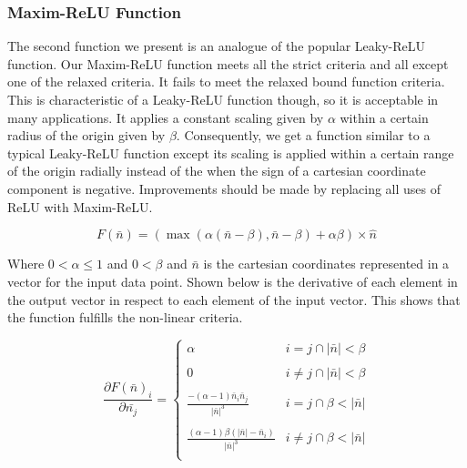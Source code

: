 \documentclass[onecolumn]{article}
\begin{document}
    \subsubsection{Maxim-ReLU Function}
    The second function we present is an analogue of the popular Leaky-ReLU function. Our Maxim-ReLU function meets all the strict criteria and all except one of the relaxed criteria. It fails to meet the relaxed bound function criteria. This is characteristic of a Leaky-ReLU function though, so it is acceptable in many applications. It applies a constant scaling given by $\alpha$ within a certain radius of the origin given by $\beta$. Consequently, we get a function similar to a typical Leaky-ReLU function except its scaling is applied within a certain range of the origin radially instead of the when the sign of a cartesian coordinate component is negative. Improvements should be made by replacing all uses of ReLU with Maxim-ReLU.
    
    \begin{equation}
        \label{eqn: Maxim-ReLU Function}
        F\left(\bar{n}\right)=\left(\max\left(\alpha\left(\bar{n}-\beta\right),\bar{n}-\beta\right)+\alpha\beta\right)\times\hat{n} 
    \end{equation}

    Where ${0} < \alpha \leq {1}$ and ${0} < \beta$ and $\bar{n}$ is the cartesian coordinates represented in a vector for the input data point. Shown below is the derivative of each element in the output vector in respect to each element of the input vector. This shows that the function fulfills the non-linear criteria.

    \[\frac{\partial F\left(\bar{n}\right)_{i}}{\partial \bar{n_{j}}}=\left\{
    \begin{array}{ll}
        \alpha & i = j \cap |\bar{n}|<\beta \\\\
        0 & i \neq j \cap |\bar{n}|<\beta \\\\
        \frac{-\left(\alpha-1\right)\bar{n}_{i}\bar{n}_{j}}{|\bar{n}|^{3}} & i = j \cap \beta<|\bar{n}|  \\\\
        \frac{\left(\alpha-1\right)\beta\left(|\bar{n}|-\bar{n}_{i}\right)}{|\bar{n}|^{3}} & i \neq j \cap \beta<|\bar{n}| \\

    \end{array} 
    \right. \]
\end{document}
